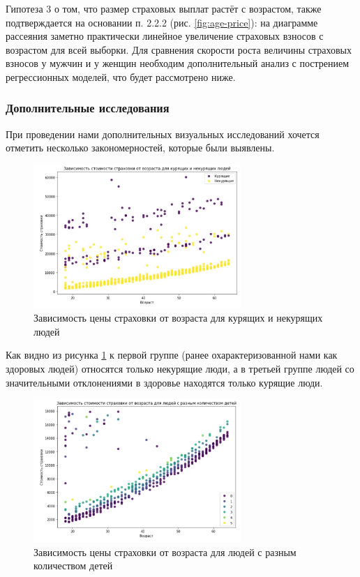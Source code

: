 \documentclass[a4paper,12pt]{article}
\begin{document}
Гипотеза 3 о том, что размер страховых выплат растёт с возрастом, также подтверждается на основании п. 2.2.2 (рис. \ref{fig:age-price}): на диаграмме рассеяния заметно практически линейное увеличение страховых взносов с возрастом для всей выборки. Для сравнения скорости роста величины страховых взносов у мужчин и у женщин необходим дополнительный анализ с пострением регрессионных моделей, что будет рассмотрено ниже.

\subsubsection{Дополнительные исследования}

При проведении нами дополнительных визуальных исследований хочется отметить несколько закономерностей, которые были выявлены.

\begin{figure}[H]
	\includegraphics[width=0.7\textwidth]{../[graphics]/age-charges-smoker.jpg}
	\centering
	\caption{Зависимость цены страховки от возраста для курящих и некурящих людей}
	\label{fig:age-charges-smoker}
\end{figure}

Как видно из рисунка \ref{fig:age-charges-smoker} к первой группе (ранее охарактеризованной нами как здоровых людей) относятся только некурящие люди, а в третьей группе людей со значительными отклонениями в здоровье находятся только курящие люди.

\begin{figure}[H]
	\includegraphics[width=0.7\textwidth]{../[graphics]/age-charges-childern.jpg}
	\centering
	\caption{Зависимость цены страховки от возраста для людей с разным количеством детей}
	\label{fig:age-charges-children}
\end{figure}
\end{document}
